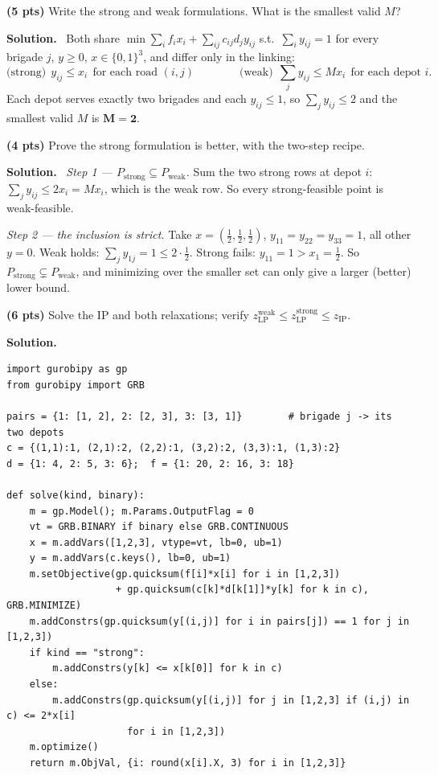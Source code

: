 \documentclass[10pt]{article}
\newenvironment{solution}
  {\par\smallskip\begingroup\color{solink}\textbf{Solution.}\ }
  {\endgroup\par}
\begin{document}
\begin{parts}
\item \textbf{(5 pts)} Write the strong and weak formulations. What is the smallest valid
  $M$?

\begin{solution}
Both share
$\min \sum_i f_i x_i + \sum_{ij} c_{ij} d_j y_{ij}$ s.t.\ $\sum_{i} y_{ij} = 1$ for every
brigade $j$, $y \ge 0$, $x \in \{0,1\}^3$, and differ only in the linking:
\[
  \text{(strong)} \ \ y_{ij} \le x_i \ \ \text{for each road } (i,j)
  \qquad\qquad
  \text{(weak)} \ \ \textstyle\sum_{j} y_{ij} \le M x_i \ \ \text{for each depot } i .
\]
Each depot serves exactly two brigades and each $y_{ij} \le 1$, so
$\sum_j y_{ij} \le 2$ and the smallest valid $M$ is $\mathbf{M = 2}$.
\end{solution}

\item \textbf{(4 pts)} Prove the strong formulation is better, with the two-step recipe.

\begin{solution}
\emph{Step 1 --- $P_{\mathrm{strong}} \subseteq P_{\mathrm{weak}}$.} Sum the two strong rows
at depot $i$: $\sum_j y_{ij} \le 2 x_i = M x_i$, which is the weak row. So every strong-feasible
point is weak-feasible.

\emph{Step 2 --- the inclusion is strict.} Take $x = (\tfrac12, \tfrac12, \tfrac12)$,
$y_{11} = y_{22} = y_{33} = 1$, all other $y = 0$. Weak holds: $\sum_j y_{1j} = 1 \le 2 \cdot \tfrac12$.
Strong fails: $y_{11} = 1 > x_1 = \tfrac12$. So $P_{\mathrm{strong}} \subsetneq P_{\mathrm{weak}}$,
and minimizing over the smaller set can only give a larger (better) lower bound.
\end{solution}

\item \textbf{(6 pts)} Solve the IP and both relaxations; verify
  $z_{\mathrm{LP}}^{\text{weak}} \le z_{\mathrm{LP}}^{\text{strong}} \le z_{\mathrm{IP}}$.

\begin{solution}
\begin{lstlisting}
import gurobipy as gp
from gurobipy import GRB

pairs = {1: [1, 2], 2: [2, 3], 3: [3, 1]}        # brigade j -> its two depots
c = {(1,1):1, (2,1):2, (2,2):1, (3,2):2, (3,3):1, (1,3):2}
d = {1: 4, 2: 5, 3: 6};  f = {1: 20, 2: 16, 3: 18}

def solve(kind, binary):
    m = gp.Model(); m.Params.OutputFlag = 0
    vt = GRB.BINARY if binary else GRB.CONTINUOUS
    x = m.addVars([1,2,3], vtype=vt, lb=0, ub=1)
    y = m.addVars(c.keys(), lb=0, ub=1)
    m.setObjective(gp.quicksum(f[i]*x[i] for i in [1,2,3])
                   + gp.quicksum(c[k]*d[k[1]]*y[k] for k in c), GRB.MINIMIZE)
    m.addConstrs(gp.quicksum(y[(i,j)] for i in pairs[j]) == 1 for j in [1,2,3])
    if kind == "strong":
        m.addConstrs(y[k] <= x[k[0]] for k in c)
    else:
        m.addConstrs(gp.quicksum(y[(i,j)] for j in [1,2,3] if (i,j) in c) <= 2*x[i]
                     for i in [1,2,3])
    m.optimize()
    return m.ObjVal, {i: round(x[i].X, 3) for i in [1,2,3]}


\end{lstlisting}
\end{solution}
\end{parts}
\end{document}
